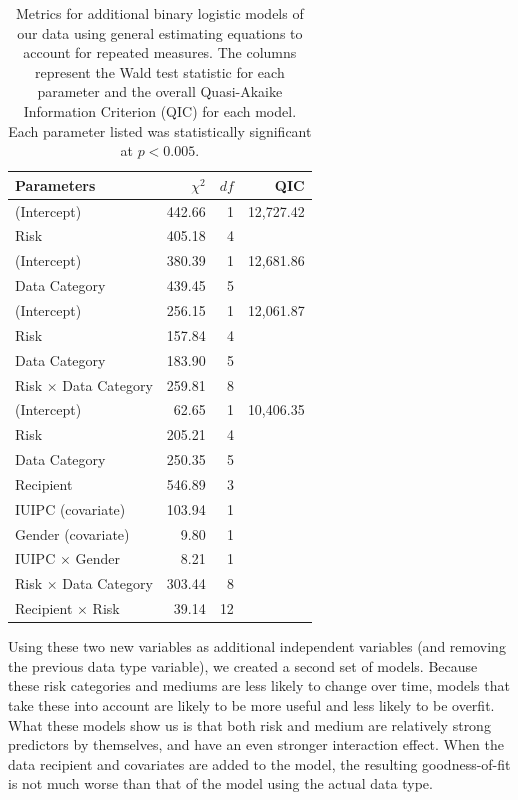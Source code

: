 \documentclass[conference]{IEEEtran}
\begin{document}
\begin{table}[t]
\centering
\begin{tabular}{|l| r| r| r|}
\hline
Parameters & $\chi^2$ & $df$ & QIC\\
\hline
\hline
(Intercept) & 442.66 & 1 & 12,727.42\\
Risk & 405.18 & 4 & \\
\hline
(Intercept) & 380.39 & 1 & 12,681.86\\
Data Category & 439.45 & 5 & \\
\hline
(Intercept) & 256.15 & 1 & 12,061.87\\
Risk & 157.84 & 4 & \\
Data Category & 183.90 & 5 & \\
Risk $\times$ Data Category & 259.81 & 8 & \\
\hline
(Intercept) & 62.65 & 1 & 10,406.35\\
Risk & 205.21 & 4 & \\
Data Category & 250.35 & 5 & \\
Recipient & 546.89 & 3 & \\
IUIPC (covariate) & 103.94 & 1 & \\
Gender (covariate) & 9.80 & 1 & \\
IUIPC $\times$ Gender & 8.21 & 1 & \\
Risk $\times$ Data Category & 303.44 & 8 & \\
Recipient $\times$ Risk & 39.14 & 12 & \\
\hline
\end{tabular}
\caption{Metrics for additional binary logistic models of our data using general estimating equations to account for repeated measures. The columns represent the Wald test statistic for each parameter and the overall Quasi-Akaike Information Criterion (QIC) for each model. Each parameter listed was statistically significant at $p<0.005$.}
\label{regression2}
\end{table}

Using these two new variables as additional independent variables (and removing the previous data type variable), we created a second set of models. Because these risk categories and mediums are less likely to change over time, models that take these into account are likely to be more useful and less likely to be overfit. What these models show us is that both risk and medium are relatively strong predictors by themselves, and have an even stronger interaction effect. When the data recipient and covariates are added to the model, the resulting goodness-of-fit is not much worse than that of the model using the actual data type. 
\end{document}
